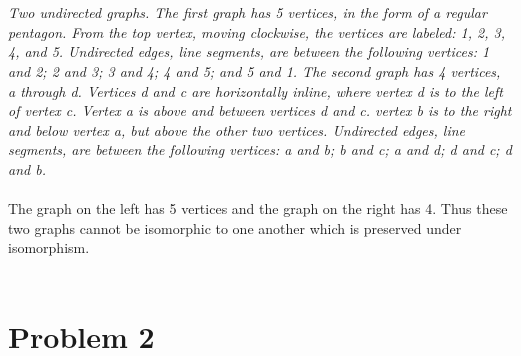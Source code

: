 \begin{enumerate}[label=(\alph*)]
\\\\
{\color{blue}{\bf Figure 5:} \emph{Two undirected graphs. The first graph has 5 vertices, in the form of a regular pentagon. From the top vertex, moving clockwise, the vertices are labeled: 1, 2, 3, 4, and 5. Undirected edges, line segments, are between the following vertices: 1 and 2; 2 and 3; 3 and 4; 4 and 5; and 5 and 1. The second graph has 4 vertices, a through d. Vertices d and c are horizontally inline, where vertex d is to the left of vertex c. Vertex a is above and between vertices d and c. vertex b is to the right and below vertex a, but above the other two vertices. Undirected edges, line segments, are between the following vertices: a and b; b and c; a and d; d and c; d and b.
}
}
\\
\\
The graph on the left has 5 vertices and the graph on the right has 4. Thus these two graphs cannot be isomorphic to one another which is preserved under isomorphism.
\\\\

\end{enumerate}    
    
 \newpage

 

\section*{Problem 2}    
    
